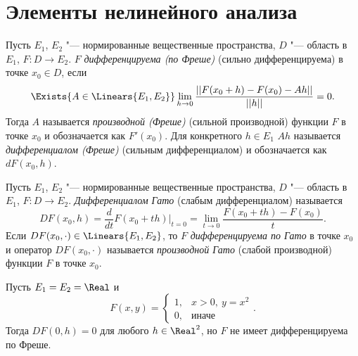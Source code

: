 \documentclass[main]{subfiles}
\begin{document}
\section{Элементы нелинейного анализа}%


\begin{definition}
  Пусть \( E_1 \), \( E_2 \) "--- нормированные вещественные пространства,
  \( D \) "--- область в \( E_1 \), \( F: D \to E_2 \).
  \( F \) \emph{дифференцируема (по Фреше)}
  (сильно дифференцируема)
  в точке \( x_0 \in D \),
  если
  \[
    \Exists{A \in \Linears{E_1, E_2}}
    \lim_{h \to 0} \frac{||F(x_0 + h) - F(x_0) - Ah||}{||h||} = 0.
  \]
  Тогда \( A \) называется \emph{производной (Фреше)}
  (сильной производной)
  функции \( F \) в точке \( x_0 \) и обозначается как \( F'(x_0) \).
  Для конкретного \( h \in E_1 \)
  \( Ah \) называется \emph{дифференциалом (Фреше)}
  (сильным дифференциалом)
  и обозначается как \( dF(x_0, h) \).
\end{definition}

\begin{definition}
  Пусть \( E_1 \), \( E_2 \) "--- нормированные вещественные пространства,
  \( D \) "--- область в \( E_1 \), \( F: D \to E_2 \).
  \emph{Дифференциалом Гато} (слабым дифференциалом)
  называется
  \[
    DF(x_0, h) = \frac{d}{dt} F(x_0 + t h) \bigr|_{t=0} =
    \lim_{t \to 0} \frac{F(x_0 + th) - F(x_0)}{t}.
  \]
  Если \( DF(x_0, \cdot) \in \Linears{E_1, E_2} \),
  то \( F \) \emph{дифференцируема по Гато} в точке \( x_0 \)
  и оператор \( DF(x_0, \cdot) \) называется
  \emph{производной Гато} (слабой производной)
  функции \( F \) в точке \( x_0 \).
\end{definition}

\begin{example}
  Пусть \( E_1 = E_2 = \Real \)
  и
  \[
    F(x, y) = \begin{cases}
      1, & x > 0, \: y = x^2 \\
      0, & \text{иначе}
    \end{cases}.
  \]
  Тогда \( DF(0, h) = 0 \) для любого \( h \in \Real^2 \),
  но \( F \) не имеет дифференцируема по Фреше.
\end{example}
\end{document}

